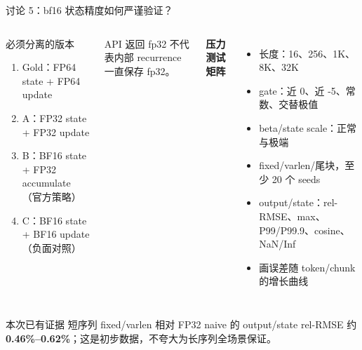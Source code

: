 \documentclass[aspectratio=169,10pt]{beamer}
\newcommand{\key}[1]{\textcolor{KdaBlue}{\ifmmode\boldsymbol{#1}\else\textbf{#1}\fi}}
\begin{document}
\begin{frame}{讨论 5：bf16 状态精度如何严谨验证？}
  \small
  \begin{columns}[T,onlytextwidth]
      \begin{block}{必须分离的版本}
        \begin{enumerate}
          \item Gold：FP64 state + FP64 update
          \item A：FP32 state + FP32 update
          \item B：BF16 state + FP32 accumulate（官方策略）
          \item C：BF16 state + BF16 update（负面对照）
        \end{enumerate}
      \end{block}
      \alert{API 返回 fp32 不代表内部 recurrence 一直保存 fp32。}

      \textbf{压力测试矩阵}
      \begin{itemize}
        \item 长度：16、256、1K、8K、32K
        \item gate：近 0、近 -5、常数、交替极值
        \item beta/state scale：正常与极端
        \item fixed/varlen/尾块，至少 20 个 seeds
        \item output/state：rel-RMSE、max、P99/P99.9、cosine、NaN/Inf
        \item 画误差随 token/chunk 的增长曲线
      \end{itemize}
  \end{columns}

  \vspace{0.35em}
  \begin{block}{本次已有证据}
    短序列 fixed/varlen 相对 FP32 naive 的 output/state rel-RMSE 约
    \key{0.46\%--0.62\%}；这是初步数据，不夸大为长序列全场景保证。
  \end{block}

\end{frame}
\end{document}
